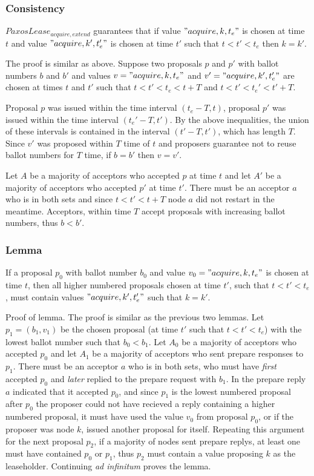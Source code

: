 \documentclass[12pt]{amsart}
\begin{document}
\subsubsection{ Consistency } $PaxosLease_{acquire, extend}$ guarantees that if value $"acquire, k, t_e"$ is chosen at time $t$ and value $"acquire, k', t_e'"$ is chosen at time $t'$ such that $t < t' < t_e$ then $k = k'$.

The proof is similar as above. Suppose two proposals $p$ and $p'$ with ballot numbers $b$ and $b'$ and values $v = "acquire, k, t_e"$ and $v' = "acquire, k', t_e'"$ are chosen at times $t$ and $t'$ such that $t < t' < t_e < t + T$ and $t < t' < t_e' < t' + T$.

Proposal $p$ was issued within the time interval $(t_e - T, t)$, proposal $p'$ was issued within the time interval $(t_e' - T, t')$. By the above inequalities, the union of these intervals is contained in the interval $(t' - T, t')$, which has length $T$. Since $v'$ was proposed within $T$ time of $t$ and proposers guarantee not to reuse ballot numbers for $T$ time, if $b = b'$ then $v = v'$.

Let $A$ be a majority of acceptors who accepted $p$ at time $t$ and let $A'$ be a majority of acceptors who accepted $p'$ at time $t'$.  There must be an acceptor $a$ who is in both sets and since $t < t' < t + T$ node $a$ did not restart in the meantime. Acceptors, within time $T$ accept proposals with increasing ballot numbers, thus $b < b'$.

\subsubsection{ Lemma } If a proposal $p_0$ with ballot number $b_0$ and value $v_0 = "acquire, k, t_e"$ is chosen at time $t$, then all higher numbered proposals chosen at time $t'$, such that $t < t' < t_e$, must contain values $"acquire, k', t_e'"$ such that $k = k'$.

Proof of lemma. The proof is similar as the previous two lemmas. Let $p_1 = (b_1, v_1)$ be the chosen proposal (at time $t'$ such that $t < t' < t_e$) with the lowest ballot number such that $b_0 < b_1$. Let $A_0$ be a majority of acceptors who accepted $p_0$ and let $A_1$ be a majority of acceptors who sent prepare responses to $p_1$. There must be an acceptor $a$ who is in both sets, who must have \emph{first} accepted $p_0$ and \emph{later} replied to the prepare request with $b_1$. In the prepare reply $a$ indicated that it accepted $p_0$, and since $p_1$ is the lowest numbered proposal after $p_0$ the proposer could not have recieved a reply containing a higher numbered proposal, it must have used the value $v_0$ from proposal $p_0$, or if the proposer was node $k$, issued another proposal for itself. Repeating this argument for the next proposal $p_2$, if a majority of nodes sent prepare replys, at least one must have contained $p_0$ or $p_1$, thus $p_2$ must contain a value proposing $k$ as the leaseholder. Continuing \emph{ad infinitum} proves the lemma.
\end{document}
